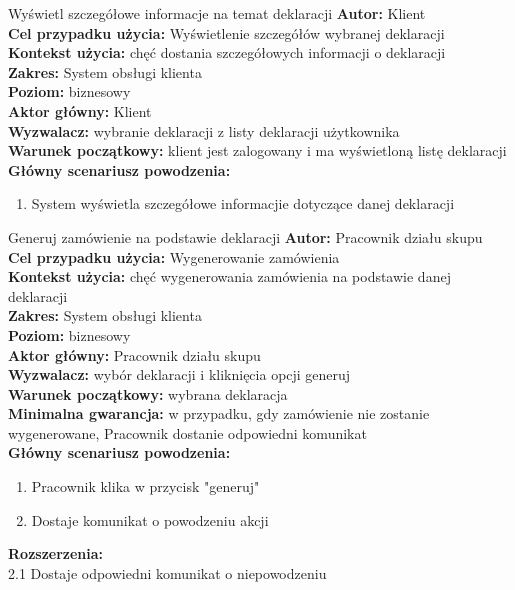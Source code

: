 \begin{usecase}{Wyświetl szczegółowe informacje na temat deklaracji}
	\textbf{Autor:} Klient\\
	\textbf{Cel przypadku użycia:} Wyświetlenie szczegółów wybranej deklaracji \\
	\textbf{Kontekst użycia:} chęć dostania szczegółowych informacji o deklaracji\\
	\textbf{Zakres:} System obsługi klienta \\
	\textbf{Poziom:} biznesowy \\
	\textbf{Aktor główny:} Klient\\
	\textbf{Wyzwalacz:} wybranie deklaracji z listy deklaracji użytkownika \\
	\textbf{Warunek początkowy:} klient jest zalogowany i ma wyświetloną listę deklaracji\\
	\textbf{Główny scenariusz powodzenia:} \\
		\begin{enumerate}
			\item System wyświetla szczegółowe informacjie dotyczące danej deklaracji
		\end{enumerate}
\end{usecase}

\begin{usecase}{Generuj zamówienie na podstawie deklaracji}
	\textbf{Autor:} Pracownik działu skupu\\
	\textbf{Cel przypadku użycia:} Wygenerowanie zamówienia \\
	\textbf{Kontekst użycia:} chęć wygenerowania zamówienia na podstawie danej deklaracji\\
	\textbf{Zakres:} System obsługi klienta \\
	\textbf{Poziom:} biznesowy \\
	\textbf{Aktor główny:} Pracownik działu skupu\\
	\textbf{Wyzwalacz:} wybór deklaracji i kliknięcia opcji generuj \\
	\textbf{Warunek początkowy:} wybrana deklaracja \\
	\textbf{Minimalna gwarancja:} w przypadku, gdy zamówienie nie zostanie wygenerowane, Pracownik dostanie odpowiedni komunikat \\
	\textbf{Główny scenariusz powodzenia:} \\
		\begin{enumerate}
			\item Pracownik klika w przycisk "generuj"
			\item Dostaje komunikat o powodzeniu akcji
		\end{enumerate}
	\textbf{Rozszerzenia:} \\
			2.1 Dostaje odpowiedni komunikat o niepowodzeniu
\end{usecase}

